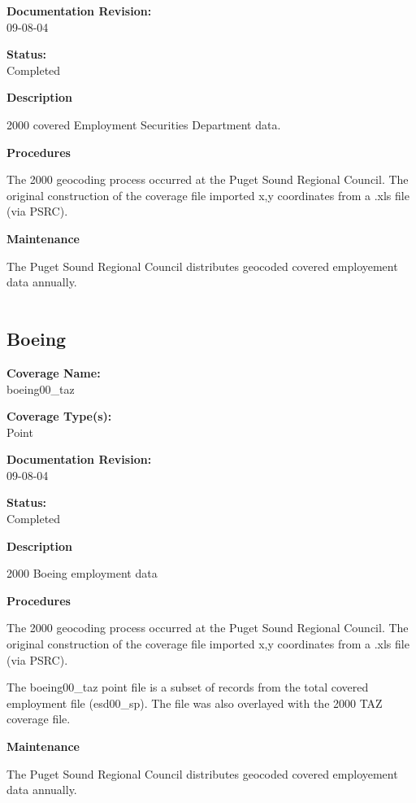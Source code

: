 {\bf \large Documentation Revision:}\\
09-08-04

{\bf \large Status:}\\
Completed

{\bf \large Description}

2000 covered Employment Securities Department data.

{\bf \large Procedures}

The 2000 geocoding process occurred at the Puget Sound Regional
Council. The original construction of the coverage file imported
x,y coordinates from a .xls file (via PSRC).

{\bf \large Maintenance}

The Puget Sound Regional Council distributes geocoded covered
employement data annually.

\begin{landscape}
\begin{longtable}{llrrrrrc}

\end{longtable}
\end{landscape}
\newpage

\subsection{Boeing}
{\bf \large Coverage Name:}\\
boeing00\_taz

{\bf \large Coverage Type(s):}\\
Point

{\bf \large Documentation Revision:}\\
09-08-04

{\bf \large Status:}\\
Completed

{\bf \large Description}

2000 Boeing employment data

{\bf \large Procedures}

The 2000 geocoding process occurred at the Puget Sound Regional
Council. The original construction of the coverage file imported
x,y coordinates from a .xls file (via PSRC).

The boeing00\_taz point file is a subset of records from the total
covered employment file (esd00\_sp). The file was also overlayed
with the 2000 TAZ coverage file.

{\bf \large Maintenance}

The Puget Sound Regional Council distributes geocoded covered
employement data annually.

